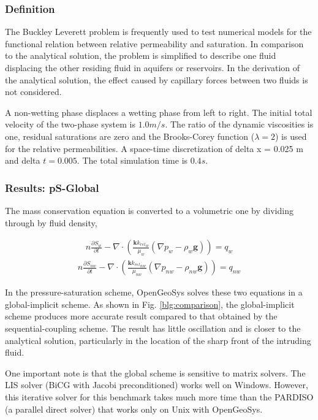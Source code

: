 \subsubsection*{Definition}
The Buckley Leverett problem is frequently used to test numerical models for the functional relation between relative permeability and saturation. In comparison to the analytical solution, the problem is simplified to describe one fluid displacing the other residing fluid in aquifers or reservoirs. In the derivation of the analytical solution, the effect caused by capillary forces between two fluids is not considered.

A non-wetting phase displaces a wetting phase from left to right. The initial total velocity of the two-phase system is $1.0 m/s$. The ratio of the dynamic viscosities is one, residual saturations are zero and the Brooks-Corey function ($\lambda = 2$) is used for the relative permeabilities. A space-time discretization of delta x = 0.025 m and delta $t = 0.005$. The total simulation time is $0.4 s$.

\subsubsection*{Results: pS-Global}
The mass conservation equation is converted to a volumetric one by dividing through by fluid density,

\begin{align}
n\frac{{\partial S_{w}}}{{\partial t }} -
\nabla \cdot \left({\frac{{\mathbf k {k_{rel}}_w }}{{\mu_w }}\left( {\nabla p_w - \rho _w
\mathbf g} \right)} \right) = q_w
\label{eq:w_eqn}
\end{align}
\begin{align}
n\frac{{\partial S_{nw}}}{{\partial t }} -
\nabla \cdot \left({\frac{{\mathbf k {k_{rel}}_{nw} }}{{\mu_{nw} }}\left( {\nabla p_{nw} - \rho _{nw}\mathbf g} \right)} \right) = q_{nw}
\label{eq:nw_eqn}
\end{align}

In the pressure-saturation scheme, OpenGeoSys solves these two equations in a global-implicit scheme. As shown in Fig. \ref{blg:comparison}, the global-implicit scheme produces more accurate result compared to that obtained by the sequential-coupling scheme. The result has little oscillation and is closer to the analytical solution, particularly in the location of the sharp front of the intruding fluid.

One important note is that the global scheme is sensitive to matrix solvers. The LIS solver (BiCG with Jacobi preconditioned) works well on Windows. However, this iterative solver for this benchmark takes much more time than the PARDISO (a parallel direct solver) that works only on Unix with OpenGeoSys.

